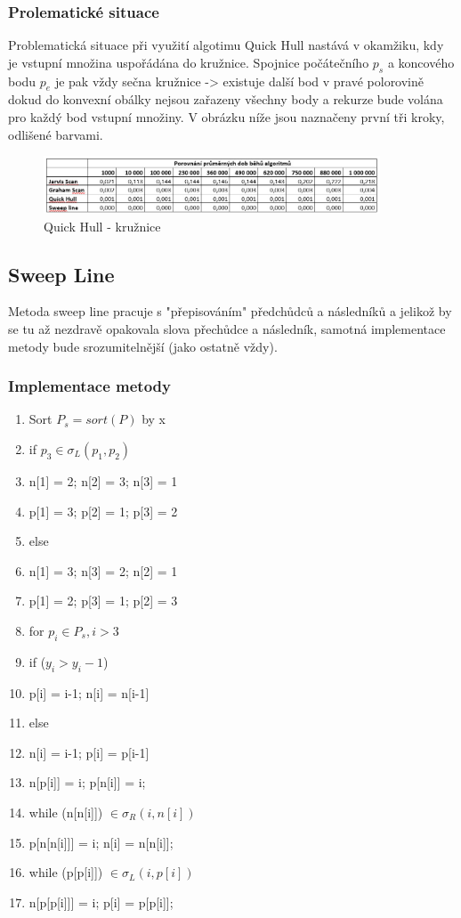 \documentclass[a4paper, 12pt]{article}
\begin{document}
\subsubsection{Prolematické situace}
Problematická situace při využití algotimu Quick Hull nastává v okamžiku, kdy je vstupní množina uspořádána do kružnice. Spojnice počátečního $p_s$ a koncového bodu $p_e$ je pak vždy sečna kružnice -> existuje další bod v pravé polorovině dokud do konvexní obálky nejsou zařazeny všechny body a rekurze bude volána pro každý bod vstupní množiny. V obrázku níže jsou naznačeny první tři kroky, odlišené barvami.

\begin{figure}[h]
	\centering
	\includegraphics[width=10cm]{circle.jpg}
	\caption{Quick Hull - kružnice}
\end{figure}
\clearpage

\clearpage
\subsection{Sweep Line}
Metoda sweep line pracuje s "přepisováním" předchůdců a  následníků a jelikož by se tu až nezdravě opakovala slova přechůdce a následník, samotná implementace metody bude srozumitelnější (jako ostatně vždy).

\subsubsection{Implementace metody}
\begin{enumerate}
	\item  Sort $P_s = sort (P)$ by x
	\item if $p_3 \in \sigma_L (p_1, p_2)$
	\item \hspace {1cm} n[1] = 2; n[2] = 3; n[3] = 1
	\item \hspace {1cm} p[1] = 3; p[2] = 1; p[3] = 2
	\item else
	\item \hspace {1cm} n[1] = 3; n[3] = 2; n[2] = 1
	\item \hspace {1cm} p[1] = 2; p[3] = 1; p[2] = 3
	\item for $p_i \in P_s, i > 3$
	\item \hspace {1cm} if ($y_i>y_i-1$) 
	\item \hspace {2cm} p[i] = i-1; n[i] = n[i-1]
	\item \hspace {1cm} else 
	\item \hspace {2cm} n[i] = i-1; p[i] = p[i-1]
	\item \hspace {1cm}n[p[i]] = i; p[n[i]] = i;
	\item \hspace {1cm}while (n[n[i]]) $\in \sigma_R (i, n[i]) $
	\item \hspace {2cm} p[n[n[i]]] = i; n[i] = n[n[i]];
	\item \hspace {1cm} while (p[p[i]]) $\in \sigma_L (i, p[i]) $
	\item \hspace {2cm} n[p[p[i]]] = i; p[i] = p[p[i]];
\end{enumerate}
\clearpage
\end{document}
